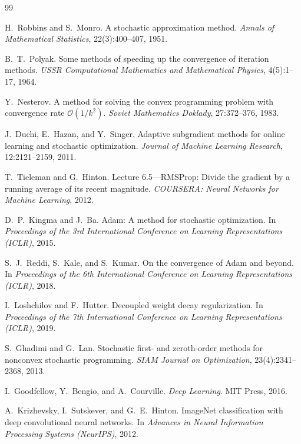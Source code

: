 \documentclass[11pt,twoside,openright]{book}
\begin{document}
\begin{thebibliography}{99}

H.~Robbins and S.~Monro.
\newblock A stochastic approximation method.
\newblock \emph{Annals of Mathematical Statistics}, 22(3):400--407, 1951.

B.~T.~Polyak.
\newblock Some methods of speeding up the convergence of iteration methods.
\newblock \emph{USSR Computational Mathematics and Mathematical Physics},
  4(5):1--17, 1964.

Y.~Nesterov.
\newblock A method for solving the convex programming problem with convergence
  rate $\mathcal{O}(1/k^2)$.
\newblock \emph{Soviet Mathematics Doklady}, 27:372--376, 1983.

J.~Duchi, E.~Hazan, and Y.~Singer.
\newblock Adaptive subgradient methods for online learning and stochastic
  optimization.
\newblock \emph{Journal of Machine Learning Research}, 12:2121--2159, 2011.

T.~Tieleman and G.~Hinton.
\newblock Lecture 6.5---RMSProp: Divide the gradient by a running average of
  its recent magnitude.
\newblock \emph{COURSERA: Neural Networks for Machine Learning}, 2012.

D.~P.~Kingma and J.~Ba.
\newblock Adam: A method for stochastic optimization.
\newblock In \emph{Proceedings of the 3rd International Conference on Learning
  Representations (ICLR)}, 2015.

S.~J.~Reddi, S.~Kale, and S.~Kumar.
\newblock On the convergence of Adam and beyond.
\newblock In \emph{Proceedings of the 6th International Conference on Learning
  Representations (ICLR)}, 2018.

I.~Loshchilov and F.~Hutter.
\newblock Decoupled weight decay regularization.
\newblock In \emph{Proceedings of the 7th International Conference on Learning
  Representations (ICLR)}, 2019.

S.~Ghadimi and G.~Lan.
\newblock Stochastic first- and zeroth-order methods for nonconvex stochastic
  programming.
\newblock \emph{SIAM Journal on Optimization}, 23(4):2341--2368, 2013.

I.~Goodfellow, Y.~Bengio, and A.~Courville.
\newblock \emph{Deep Learning}.
\newblock MIT Press, 2016.

A.~Krizhevsky, I.~Sutskever, and G.~E.~Hinton.
\newblock ImageNet classification with deep convolutional neural networks.
\newblock In \emph{Advances in Neural Information Processing Systems (NeurIPS)},
  2012.


\end{thebibliography}
\end{document}
